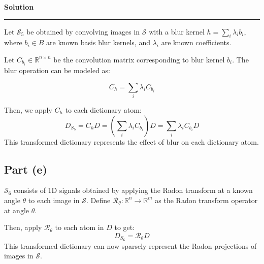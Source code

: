 \documentclass[a4paper,12pt]{article}
\newenvironment{solution}[2][]{%
    \begin{mdframed}[linecolor=blue!70!black, linewidth=2pt, roundcorner=10pt, backgroundcolor=yellow!10!white, skipabove=12pt, skipbelow=12pt]%
        \textbf{\large #2}
        \par\noindent\rule{\textwidth}{0.4pt}
}{
    \end{mdframed}
}
\begin{document}
\begin{solution}{Solution}
Let \( \mathcal{S}_5 \) be obtained by convolving images in \( \mathcal{S} \) with a blur kernel \( h = \sum_i \lambda_i b_i \), where \( b_i \in B \) are known basis blur kernels, and \( \lambda_i \) are known coefficients.

\noindent Let \( C_{b_i} \in \mathbb{R}^{n \times n} \) be the convolution matrix corresponding to blur kernel \( b_i \). The blur operation can be modeled as:

\begin{equation}
C_h = \sum_i \lambda_i C_{b_i}
\end{equation}

\noindent Then, we apply \( C_h \) to each dictionary atom:
\begin{equation}
D_{S_5} = C_h D = \left( \sum_i \lambda_i C_{b_i} \right) D = \sum_i \lambda_i C_{b_i} D
\end{equation}
This transformed dictionary represents the effect of blur on each dictionary atom.


\subsection*{Part (e)}

\( \mathcal{S}_6 \) consists of 1D signals obtained by applying the Radon transform at a known angle \( \theta \) to each image in \( \mathcal{S} \). Define \( \mathcal{R}_\theta: \mathbb{R}^{n} \rightarrow \mathbb{R}^{m} \) as the Radon transform operator at angle \( \theta \).

\noindent Then, apply \( \mathcal{R}_\theta \) to each atom in \( D \) to get:
\begin{equation}
D_{S_6} = \mathcal{R}_\theta D
\end{equation}
This transformed dictionary can now sparsely represent the Radon projections of images in \( \mathcal{S} \).

\end{solution}
\end{document}
